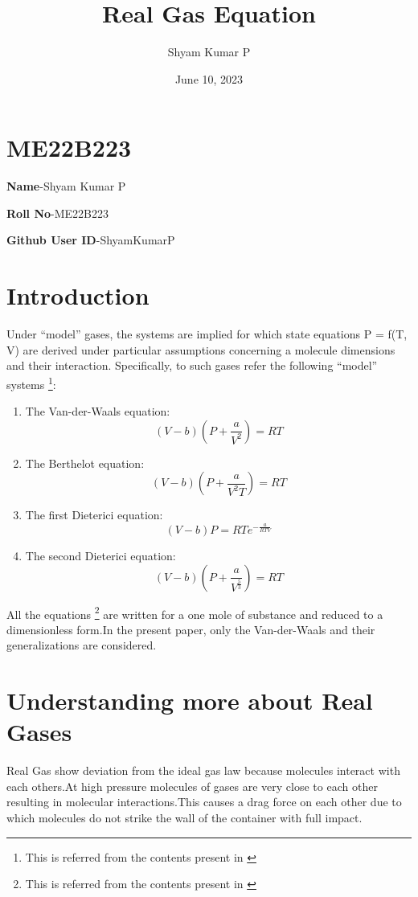 \documentclass[12pt,a4paper]{article}
\author{Shyam Kumar P}
\title{Real Gas Equation}
\date{June 10, 2023}
\begin{document}
\maketitle

\section{ME22B223}
\textbf{Name}-Shyam Kumar P

\textbf{Roll No}-ME22B223

\textbf{Github User ID}-ShyamKumarP


\section{Introduction}
Under “model” gases, the systems are implied for
which state equations P = f(T, V) are derived under
particular assumptions concerning a molecule
dimensions and their interaction. Specifically, to such
gases refer the following “model” systems \footnote{This is referred from the contents present in \cite{sobko2014description}}: 

\begin{enumerate}
    \item The Van-der-Waals equation:
    \begin{equation}
        (V-b)(P+\frac{a}{V^2})=RT
    \end{equation}
    \item The Berthelot equation:
    \begin{equation}
        (V-b)(P+\frac{a}{V^2T})=RT
    \end{equation}
    \item The first Dieterici equation:
    \begin{equation}
        (V-b)P=RTe^{-\frac{a}{RTV}}
    \end{equation}
    \item The second Dieterici equation:
    \begin{equation}
        (V-b)(P+\frac{a}{V^\frac{5}{3}})=RT
    \end{equation}
\end{enumerate}

All the equations \footnote{This is referred from the contents present in  \cite{kondepudi2014modern}} are written for a one mole of
substance and reduced to a dimensionless form.In the present paper,
only the Van-der-Waals and their generalizations are considered.

\section{Understanding more about Real Gases}
Real Gas show deviation from the ideal gas law because molecules interact with each others.At high pressure molecules of gases are very close to each other resulting in molecular interactions.This causes a drag force on each other due to which molecules do not strike the wall of the container with full impact.
\end{document}
